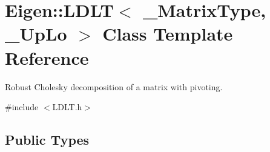 \hypertarget{class_eigen_1_1_l_d_l_t}{}\section{Eigen\+::L\+D\+LT$<$ \+\_\+\+Matrix\+Type, \+\_\+\+Up\+Lo $>$ Class Template Reference}
\label{class_eigen_1_1_l_d_l_t}


Robust Cholesky decomposition of a matrix with pivoting.  




{\ttfamily \#include $<$L\+D\+L\+T.\+h$>$}

\subsection*{Public Types}
